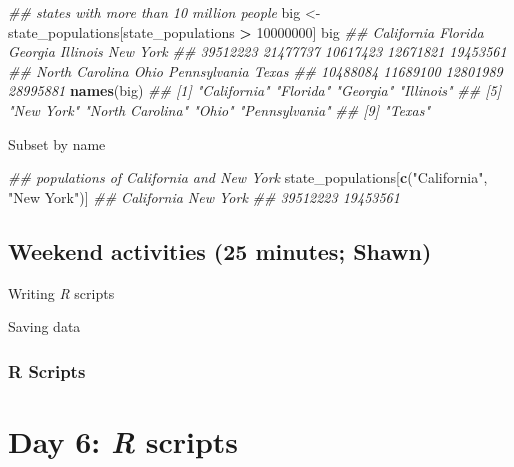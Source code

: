 \documentclass[]{book}
\newenvironment{Shaded}{\begin{snugshade}}{\end{snugshade}}
\newcommand{\CommentTok}[1]{\textcolor[rgb]{0.56,0.35,0.01}{\textit{#1}}}
\newcommand{\DecValTok}[1]{\textcolor[rgb]{0.00,0.00,0.81}{#1}}
\newcommand{\KeywordTok}[1]{\textcolor[rgb]{0.13,0.29,0.53}{\textbf{#1}}}
\newcommand{\NormalTok}[1]{#1}
\newcommand{\OperatorTok}[1]{\textcolor[rgb]{0.81,0.36,0.00}{\textbf{#1}}}
\newcommand{\StringTok}[1]{\textcolor[rgb]{0.31,0.60,0.02}{#1}}
\begin{document}
\begin{itemize}
\begin{Shaded}
\begin{Highlighting}[]
\CommentTok{## states with more than 10 million people}
\NormalTok{big <-}\StringTok{ }\NormalTok{state_populations[state_populations }\OperatorTok{>}\StringTok{ }\DecValTok{10000000}\NormalTok{]}
\NormalTok{big}
\CommentTok{##     California        Florida        Georgia       Illinois       New York }
\CommentTok{##       39512223       21477737       10617423       12671821       19453561 }
\CommentTok{## North Carolina           Ohio   Pennsylvania          Texas }
\CommentTok{##       10488084       11689100       12801989       28995881}
\KeywordTok{names}\NormalTok{(big)}
\CommentTok{## [1] "California"     "Florida"        "Georgia"        "Illinois"      }
\CommentTok{## [5] "New York"       "North Carolina" "Ohio"           "Pennsylvania"  }
\CommentTok{## [9] "Texas"}
\end{Highlighting}
\end{Shaded}

  Subset by name

\begin{Shaded}
\begin{Highlighting}[]
\CommentTok{## populations of California and New York}
\NormalTok{state_populations[}\KeywordTok{c}\NormalTok{(}\StringTok{"California"}\NormalTok{, }\StringTok{"New York"}\NormalTok{)]}
\CommentTok{## California   New York }
\CommentTok{##   39512223   19453561}
\end{Highlighting}
\end{Shaded}
\end{itemize}

\hypertarget{weekend-activities-25-minutes-shawn}{%
\subsection{Weekend activities (25 minutes; Shawn)}\label{weekend-activities-25-minutes-shawn}}

Writing \emph{R} scripts

Saving data

\hypertarget{r-scripts}{%
\subsubsection*{R Scripts}\label{r-scripts}}

\hypertarget{day-6-r-scripts}{%
\section{\texorpdfstring{Day 6: \emph{R} scripts}{Day 6: R scripts}}\label{day-6-r-scripts}}
\end{document}
